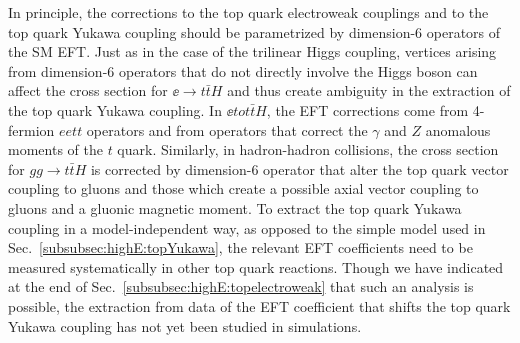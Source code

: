 In principle, the corrections to the top quark electroweak couplings
and to the top quark Yukawa coupling should be parametrized by
dimension-6 operators of the SM EFT.   Just as in the case of the
trilinear Higgs coupling, vertices arising from dimension-6 operators
that do not directly involve the Higgs boson can affect the cross
section for $\ee\to t\bar t H$ and thus create ambiguity in the
extraction of the top quark Yukawa coupling.   In $\ee to t\bar t H$,
the EFT corrections come from 4-fermion $eett$ operators and from
operators that correct the $\gamma$ and $Z$ anomalous moments of the
$t$ quark.   Similarly, in hadron-hadron collisions, the cross section
for $gg\to t\bar t H$ is corrected by dimension-6 operator that alter
the top quark vector coupling to gluons and those which create a
possible axial vector coupling to gluons and a gluonic magnetic
moment.  To extract the top quark Yukawa coupling in a
model-independent way, as opposed to the simple model used in
Sec.~\ref{subsubsec:highE:topYukawa}, the relevant EFT coefficients
need to be measured systematically in other top quark reactions.
Though we have indicated at the end of
Sec.~\ref{subsubsec:highE:topelectroweak} that such an analysis is
possible, the extraction from data of the EFT coefficient that shifts
the top quark Yukawa coupling has not yet been studied in simulations.